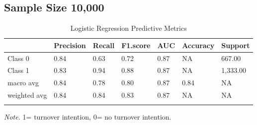 \documentclass[
  man]{apa7}
\begin{document}
\subsection{Sample Size 10,000}\label{sample-size-10000}

\begin{table}[tbp]

\begin{center}
\begin{threeparttable}

\caption{\label{tab:logitable10k}Logistic Regression Predictive Metrics}

\begin{tabular}{lllllll}
\toprule
 & \multicolumn{1}{c}{Precision} & \multicolumn{1}{c}{Recall} & \multicolumn{1}{c}{F1.score} & \multicolumn{1}{c}{AUC} & \multicolumn{1}{c}{Accuracy} & \multicolumn{1}{c}{Support}\\
\midrule
Class 0 & 0.84 & 0.63 & 0.72 & 0.87 & NA & 667.00\\
Class 1 & 0.83 & 0.94 & 0.88 & 0.87 & NA & 1,333.00\\
macro avg & 0.84 & 0.78 & 0.80 & 0.87 & 0.84 & NA\\
weighted avg & 0.84 & 0.84 & 0.83 & 0.87 & NA & NA\\
\bottomrule
\addlinespace
\end{tabular}

\begin{tablenotes}[para]
\normalsize{\textit{Note.} 1= turnover intention, 0= no turnover intention.}
\end{tablenotes}

\end{threeparttable}
\end{center}

\end{table}
\end{document}
